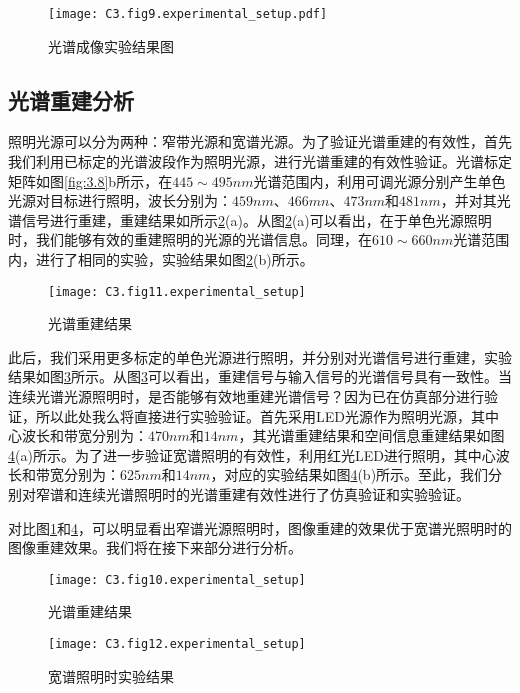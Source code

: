 \begin{figure}[htp]
	\centering
	\texttt{[image: C3.fig9.experimental\_setup.pdf]}
	\caption{光谱成像实验结果图}
	\label{fig:3.9}
\end{figure}

\subsection{光谱重建分析}
照明光源可以分为两种：窄带光源和宽谱光源。为了验证光谱重建的有效性，首先我们利用已标定的光谱波段作为照明光源，进行光谱重建的有效性验证。光谱标定矩阵如图\ref{fig:3.8}b所示，在$445 \sim 495nm$光谱范围内，利用可调光源分别产生单色光源对目标进行照明，波长分别为：$459nm$、$466mn$、$473nm$和$481nm$，并对其光谱信号进行重建，重建结果如所示\ref{fig:3.10}(a)。从图\ref{fig:3.10}(a)可以看出，在于单色光源照明时，我们能够有效的重建照明的光源的光谱信息。同理，在$610 \sim 660nm$光谱范围内，进行了相同的实验，实验结果如图\ref{fig:3.10}(b)所示。

\begin{figure}[htp]
	\centering
	\texttt{[image: C3.fig11.experimental\_setup]}
	\caption{光谱重建结果}
	\label{fig:3.10}
\end{figure}

此后，我们采用更多标定的单色光源进行照明，并分别对光谱信号进行重建，实验结果如图\ref{fig:3.11}所示。从图\ref{fig:3.11}可以看出，重建信号与输入信号的光谱信号具有一致性。当连续光谱光源照明时，是否能够有效地重建光谱信号？因为已在仿真部分进行验证，所以此处我么将直接进行实验验证。首先采用LED光源作为照明光源，其中心波长和带宽分别为：$470nm$和$14nm$，其光谱重建结果和空间信息重建结果如图\ref{fig:3.12}(a)所示。为了进一步验证宽谱照明的有效性，利用红光LED进行照明，其中心波长和带宽分别为：$625nm$和$14nm$，对应的实验结果如图\ref{fig:3.12}(b)所示。至此，我们分别对窄谱和连续光谱照明时的光谱重建有效性进行了仿真验证和实验验证。

对比图\ref{fig:3.9}和\ref{fig:3.12}，可以明显看出窄谱光源照明时，图像重建的效果优于宽谱光照明时的图像重建效果。我们将在接下来部分进行分析。

\begin{figure}[htp]
	\centering
	\texttt{[image: C3.fig10.experimental\_setup]}
	\caption{光谱重建结果}
	\label{fig:3.11}
\end{figure}
\begin{figure}[htp]
	\centering
	\texttt{[image: C3.fig12.experimental\_setup]}
	\caption{宽谱照明时实验结果}
	\label{fig:3.12}
\end{figure}

